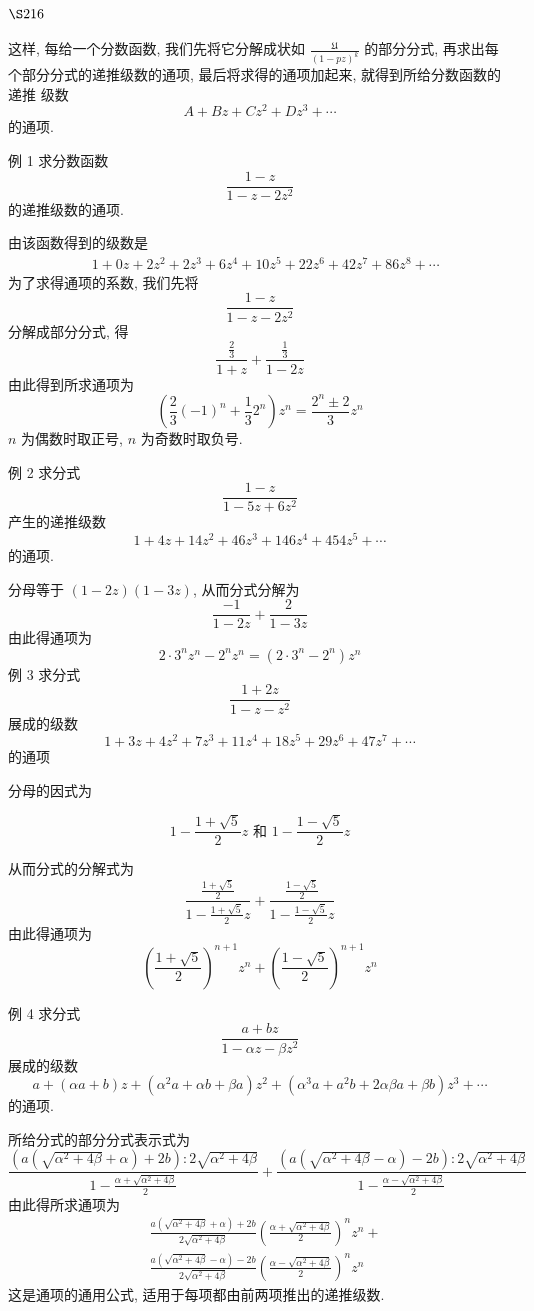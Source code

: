 \section{$\S 216$}

这样, 每给一个分数函数, 我们先将它分解成状如 $\frac{\mathfrak{U}}{(1-p z)^{k}}$ 的部分分式, 再求出每 个部分分式的递推级数的通项, 最后将求得的通项加起来, 就得到所给分数函数的递推 级数
\[
A+B z+C z^{2}+D z^{3}+\cdots
\]
的通项.

例 1 求分数函数
\[
\frac{1-z}{1-z-2 z^{2}}
\]
的递推级数的通项.

由该函数得到的级数是 
\[
\begin{aligned}
& 1+0 z+2 z^{2}+2 z^{3}+6 z^{4}+10 z^{5}+22 z^{6}+42 z^{7}+86 z^{8}+\cdots
\end{aligned}
\]
为了求得通项的系数, 我们先将
\[
\frac{1-z}{1-z-2 z^{2}}
\]
分解成部分分式, 得
\[
\frac{\frac{2}{3}}{1+z}+\frac{\frac{1}{3}}{1-2 z}
\]
由此得到所求通项为
\[
\left(\frac{2}{3}(-1)^{n}+\frac{1}{3} 2^{n}\right) z^{n}=\frac{2^{n} \pm 2}{3} z^{n}
\]
$n$ 为偶数时取正号, $n$ 为奇数时取负号.

例 2 求分式
\[
\frac{1-z}{1-5 z+6 z^{2}}
\]
产生的递推级数
\[
1+4 z+14 z^{2}+46 z^{3}+146 z^{4}+454 z^{5}+\cdots
\]
的通项.

分母等于 $(1-2 z)(1-3 z)$, 从而分式分解为
\[
\frac{-1}{1-2 z}+\frac{2}{1-3 z}
\]
由此得通项为
\[
2 \cdot 3^{n} z^{n}-2^{n} z^{n}=\left(2 \cdot 3^{n}-2^{n}\right) z^{n}
\]
例 3 求分式
\[
\frac{1+2 z}{1-z-z^{2}}
\]
展成的级数
\[
1+3 z+4 z^{2}+7 z^{3}+11 z^{4}+18 z^{5}+29 z^{6}+47 z^{7}+\cdots
\]
的通项

分母的因式为

\[
1-\frac{1+\sqrt{5}}{2} z \text { 和 } 1-\frac{1-\sqrt{5}}{2} z
\]

从而分式的分解式为
\[
\frac{\frac{1+\sqrt{5}}{2}}{1-\frac{1+\sqrt{5}}{2} z}+\frac{\frac{1-\sqrt{5}}{2}}{1-\frac{1-\sqrt{5}}{2} z}
\]
由此得通项为 
\[
\left(\frac{1+\sqrt{5}}{2}\right)^{n+1} z^n+\left(\frac{1-\sqrt{5}}{2}\right)^{n+1} z^n
\]

例 4 求分式
\[
\frac{a+b z}{1-\alpha z-\beta z^{2}}
\]
展成的级数
\[
a+(\alpha a+b) z+\left(\alpha^{2} a+\alpha b+\beta a\right) z^{2}+\left(\alpha^{3} a+a^{2} b+2 \alpha \beta a+\beta b\right) z^{3}+\cdots
\]
的通项.

所给分式的部分分式表示式为
\[
\frac{\left(a\left(\sqrt{\alpha^{2}+4 \beta}+\alpha\right)+2 b\right): 2 \sqrt{\alpha^{2}+4 \beta}}{1-\frac{\alpha+\sqrt{\alpha^{2}+4 \beta}}{2}}+\frac{\left(a\left(\sqrt{\alpha^{2}+4 \beta}-\alpha\right)-2 b\right): 2 \sqrt{\alpha^{2}+4 \beta}}{1-\frac{\alpha-\sqrt{\alpha^{2}+4 \beta}}{2}}
\]
由此得所求通项为
\[
\begin{aligned}
& \frac{a\left(\sqrt{\alpha^{2}+4 \beta}+\alpha\right)+2 b}{2 \sqrt{\alpha^{2}+4 \beta}}\left(\frac{\alpha+\sqrt{\alpha^{2}+4 \beta}}{2}\right)^{n} z^{n}+ \\
& \frac{a\left(\sqrt{\alpha^{2}+4 \beta}-\alpha\right)-2 b}{2 \sqrt{\alpha^{2}+4 \beta}}\left(\frac{\alpha-\sqrt{\alpha^{2}+4 \beta}}{2}\right)^{n} z^{n}
\end{aligned}
\]
这是通项的通用公式, 适用于每项都由前两项推出的递推级数.

